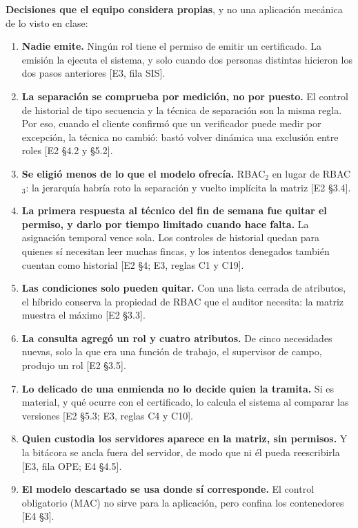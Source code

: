 \documentclass[11pt,letterpaper]{article}
\newcommand{\ev}[1]{\textrm{\small [#1]}}   %
\begin{document}
\textbf{Decisiones que el equipo considera propias}, y no una aplicación mecánica de lo visto en clase:

\begin{enumerate}
\item \textbf{Nadie emite.} Ningún rol tiene el permiso de emitir un certificado. La emisión la ejecuta el
      sistema, y solo cuando dos personas distintas hicieron los dos pasos anteriores \ev{E3, fila SIS}.
\item \textbf{La separación se comprueba por medición, no por puesto.} El control de historial de tipo
      secuencia y la técnica de separación son la misma regla. Por eso, cuando el cliente confirmó que
      un verificador puede medir por excepción, la técnica no cambió: bastó volver dinámica una
      exclusión entre roles \ev{E2 §4.2 y §5.2}.
\item \textbf{Se eligió menos de lo que el modelo ofrecía.} RBAC$_2$ en lugar de RBAC$_3$: la jerarquía
      habría roto la separación y vuelto implícita la matriz \ev{E2 §3.4}.
\item \textbf{La primera respuesta al técnico del fin de semana fue quitar el permiso, y darlo por tiempo
      limitado cuando hace falta.} La asignación temporal vence sola. Los controles de historial quedan
      para quienes sí necesitan leer muchas fincas, y los intentos denegados también cuentan como
      historial \ev{E2 §4; E3, reglas C1 y C19}.
\item \textbf{Las condiciones solo pueden quitar.} Con una lista cerrada de atributos, el híbrido
      conserva la propiedad de RBAC que el auditor necesita: la matriz muestra el máximo \ev{E2 §3.3}.
\item \textbf{La consulta agregó un rol y cuatro atributos.} De cinco necesidades nuevas, solo la que era
      una función de trabajo, el supervisor de campo, produjo un rol \ev{E2 §3.5}.
\item \textbf{Lo delicado de una enmienda no lo decide quien la tramita.} Si es material, y qué ocurre con
      el certificado, lo calcula el sistema al comparar las versiones \ev{E2 §5.3; E3, reglas C4 y C10}.
\item \textbf{Quien custodia los servidores aparece en la matriz, sin permisos.} Y la bitácora se ancla
      fuera del servidor, de modo que ni él pueda reescribirla \ev{E3, fila OPE; E4 §4.5}.
\item \textbf{El modelo descartado se usa donde sí corresponde.} El control obligatorio (MAC) no sirve para
      la aplicación, pero confina los contenedores \ev{E4 §3}.
\end{enumerate}
\end{document}
